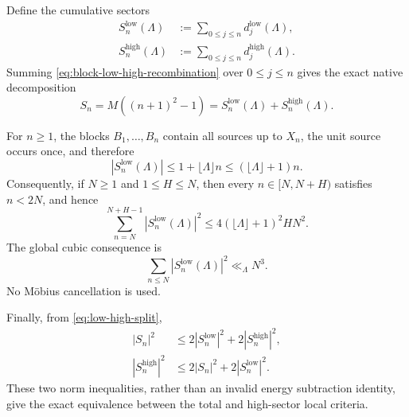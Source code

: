 Define the cumulative sectors
\begin{align}
 S_n^{\mathrm{low}}(\Lambda)
 &:={}
 \sum_{0\le j\le n}d_j^{\mathrm{low}}(\Lambda),
 \label{eq:low-prefix}\\
 S_n^{\mathrm{high}}(\Lambda)
 &:={}
 \sum_{0\le j\le n}d_j^{\mathrm{high}}(\Lambda).
 \label{eq:high-prefix}
\end{align}
Summing \cref{eq:block-low-high-recombination} over $0\le j\le n$ gives the exact native decomposition
\begin{equation}
 \boxed{
 S_n=M((n+1)^2-1)
 =S_n^{\mathrm{low}}(\Lambda)+S_n^{\mathrm{high}}(\Lambda).
 }
 \label{eq:low-high-split}
\end{equation}

For $n\ge1$, the blocks $B_1,\ldots,B_n$ contain all sources up to $X_n$, the unit source occurs once, and therefore
\begin{equation}
 |S_n^{\mathrm{low}}(\Lambda)|
 \le1+\lfloor\Lambda\rfloor n
 \le(\lfloor\Lambda\rfloor+1)n.
 \label{eq:low-prefix-bound}
\end{equation}
Consequently, if $N\ge1$ and $1\le H\le N$, then every $n\in[N,N+H)$ satisfies $n<2N$, and hence
\begin{equation}
 \boxed{
 \sum_{n=N}^{N+H-1}
 |S_n^{\mathrm{low}}(\Lambda)|^2
 \le
 4(\lfloor\Lambda\rfloor+1)^2HN^2.
 }
 \label{eq:low-local-bound}
\end{equation}
The global cubic consequence is
\begin{equation}
 \sum_{n\le N}|S_n^{\mathrm{low}}(\Lambda)|^2
 \ll_{\Lambda}N^3.
 \label{eq:low-cubic}
\end{equation}
No M\"obius cancellation is used.

Finally, from \cref{eq:low-high-split},
\begin{align}
 |S_n|^2
 &\le2|S_n^{\mathrm{low}}|^2+2|S_n^{\mathrm{high}}|^2,
 \label{eq:total-from-low-high}\\
 |S_n^{\mathrm{high}}|^2
 &\le2|S_n|^2+2|S_n^{\mathrm{low}}|^2.
 \label{eq:high-from-total-low}
\end{align}
These two norm inequalities, rather than an invalid energy subtraction identity, give the exact equivalence between the total and high-sector local criteria.

